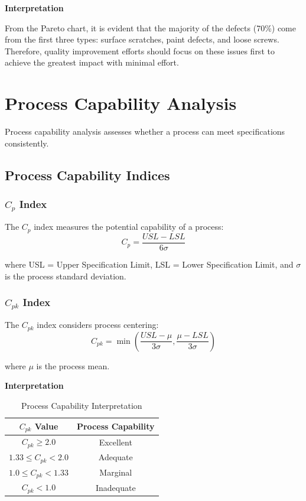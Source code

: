 \documentclass[twoside]{book}
\begin{document}
\textbf{Interpretation}

From the Pareto chart, it is evident that the majority of the defects (70\%) come from the first three types: surface scratches, paint defects, and loose screws. Therefore, quality improvement efforts should focus on these issues first to achieve the greatest impact with minimal effort.



\section{Process Capability Analysis}

Process capability analysis assesses whether a process can meet specifications consistently.

\subsection{Process Capability Indices}

\subsubsection{$C_p$ Index}

The $C_p$ index measures the potential capability of a process:
$$C_p = \frac{USL - LSL}{6\sigma}$$

where USL = Upper Specification Limit, LSL = Lower Specification Limit, and $\sigma$ is the process standard deviation.

\subsubsection{$C_{pk}$ Index}

The $C_{pk}$ index considers process centering:
$$C_{pk} = \min\left(\frac{USL - \mu}{3\sigma}, \frac{\mu - LSL}{3\sigma}\right)$$

where $\mu$ is the process mean.

\textbf{Interpretation}

\begin{table}[H]
\centering
\caption{Process Capability Interpretation}
\begin{tabular}{cc}
\toprule
$C_{pk}$ Value & Process Capability \\
\midrule
$C_{pk} \geq 2.0$ & Excellent \\
$1.33 \leq C_{pk} < 2.0$ & Adequate \\
$1.0 \leq C_{pk} < 1.33$ & Marginal \\
$C_{pk} < 1.0$ & Inadequate \\
\bottomrule
\end{tabular}
\end{table}
\end{document}
